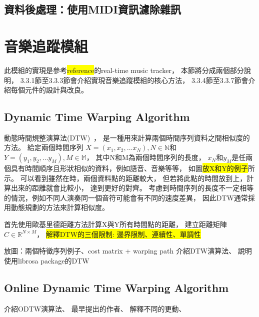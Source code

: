 \documentclass[class=NCU_thesis, crop=false]{standalone}
\begin{document}
\subsection{資料後處理：使用MIDI資訊濾除雜訊}

\pagebreak

\section{音樂追蹤模組}
此模組的實現是參考{\colorbox{yellow}{reference}}的real-time music tracker，
本節將分成兩個部分說明，
3.3.1節至3.3.3節會介紹實現音樂追蹤模組的核心方法，
3.3.4節至3.3.7節會介紹每個元件的設計與改良。

\subsection{Dynamic Time Warping Algorithm}
動態時間規整演算法(DTW)~\cite{Senin2008Dynamic}，
是一種用來計算兩個時間序列資料之間相似度的方法。
給定兩個時間序列
$X = (x_1, x_2, \dots x_N), N \in \mathbb{N}$和
$Y = (y_1, y_2, \dots y_M), M \in \mathbb{M}$，
其中N和M為兩個時間序列的長度，
$x_N$和$y_M$是任兩個具有時間順序且形狀相似的資料，例如語音、音樂等等，
如圖{\colorbox{yellow}{放X和Y的例子}}所示。
可以看到雖然在{\color{red}{t=圖上時間點}}時，兩個資料點的距離較大，
但若將此點的時間放到{\color{red}{t=圖上時間點}}上，計算出來的距離就會比較小，
達到更好的對齊。
考慮到時間序列的長度不一定相等的情況，例如不同人演奏同一個音符可能會有不同的速度差異，
因此DTW通常採用動態規劃的方法來計算相似度。

首先使用歐基里德距離方法計算X與Y所有時間點的距離，
建立距離矩陣$C \in \mathbb{R}^{N \times M}$，
{\colorbox{yellow}{解釋DTW的三個限制: 邊界限制、連續性、單調性}}




放圖：兩個特徵序列例子、cost matrix + warping path
介紹DTW演算法、
說明使用librosa package的DTW

\subsection{Online Dynamic Time Warping Algorithm}
介紹ODTW演算法、
最早提出的作者、
解釋不同的更動、
\end{document}
